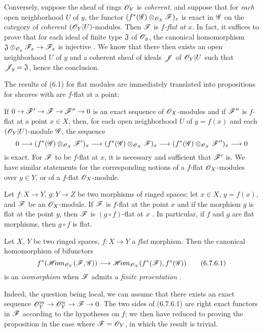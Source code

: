 \begin{env}[6.7.3]
\label{0.6.7.3}
Conversely, suppose the sheaf of rings $\mathscr{O}_Y$ is \emph{coherent}, and suppose that for
\emph{each} open neighborhood $U$ of $y$, the functor $(f^*(\mathscr{G})\otimes_{\mathscr{O}_X}\mathscr{F})_x$
is exact in $\mathscr{G}$ on the category of \emph{coherent} $(\mathscr{O}_Y|U)$-modules. Then $\mathscr{F}$ is
\emph{$f$-flat at $x$}. In fact, it suffices to prove that for each ideal of finite type
$\mathfrak{J}$ of $\mathscr{O}_y$, the canonical homomorphism
$\fk{J}\otimes_{\OO_y}\sh{F}_x\to\sh{F}_x$ is injective . We know
 that there then exists an open neighborhood
$U$ of $y$ and a coherent sheaf of ideals $\mathscr{J}$ of $\mathscr{O}_Y|U$ such that
$\mathscr{J}_y=\mathfrak{J}$, hence the conclusion.
\end{env}

\begin{env}[6.7.4]
\label{0.6.7.4}
The results of (6.1) for flat modules are immediately translated into propositions for
sheaves with are $f$-flat at a point:

If $0\to\sh{F}'\to\sh{F}\to\sh{F}''\to 0$ is an exact sequence of $\mathscr{O}_X$-modules and if
$\mathscr{F}''$ is $f$-flat at a point $x\in X$, then, for each open neighborhood $U$ of $y=f(x)$
and each $(\mathscr{O}_Y|U)$-module $\mathscr{G}$, the sequence
\[
  0\to(f^*(\sh{G})\otimes_{\OO_X}\sh{F}')_x
  \to(f^*(\sh{G})\otimes_{\OO_X}\sh{F})_x
  \to(f^*(\sh{G})\otimes_{\OO_X}\sh{F}'')_x\to 0
\]
is exact. For $\mathscr{F}$ to be $f$-flat at $x$, it is necessary and sufficient that $\mathscr{F}'$
is. We have similar statements for the corresponding notions of a $f$-flat $\mathscr{O}_X$-modules
over $y\in Y$, or of a $f$-flat $\mathscr{O}_X$-module.
\end{env}

\begin{env}[6.7.5]
\label{0.6.7.5}
Let $f:X\to Y$, $g:Y\to Z$ be two morphisms of ringed spaces; let $x\in X$, $y=f(x)$, and
$\mathscr{F}$ be an $\mathscr{O}_X$-module. If $\mathscr{F}$ is $f$-flat at the point $x$ and if the morphism
$g$ is flat at the point $y$, then $\mathscr{F}$ is $(g\circ f)$-flat at $x$ . In
particular, if $f$ and $g$ are flat morphisms, then $g\circ f$ is flat.
\end{env}

\begin{env}[6.7.6]
\label{0.6.7.6}
Let $X$, $Y$ be two ringed spaces, $f:X\to Y$ a \emph{flat} morphism. Then the canonical
homomorphism of bifunctors 
\[
  f^*(\shHom_{\OO_Y}(\sh{F},\sh{G}))\to\shHom_{\OO_X}(f^*(\sh{F}),f^*(\sh{G}))
  \tag{6.7.6.1}
\]
is an \emph{isomorphism} when $\mathscr{F}$ admits a \emph{finite presentation} .

Indeed, the question being local, we can assume that there exists an exact sequence
$\OO_Y^m\to\OO_Y^n\to\sh{F}\to 0$. The two sides of (6.7.6.1) are right exact functors in
$\mathscr{F}$ according to the hypotheses on $f$; we then have reduced to proving the proposition
in the case where $\mathscr{F}=\mathscr{O}_Y$, in which the result is trivial.
\end{env}

